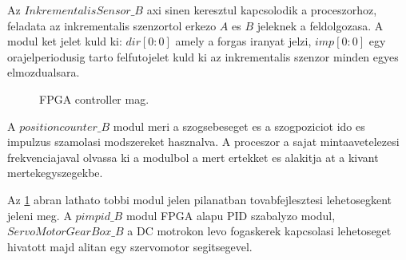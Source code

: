 Az $InkrementalisSensor\_B$ axi sinen keresztul kapcsolodik a proceszorhoz, feladata az inkrementalis szenzortol erkezo $A$ es $B$ jeleknek a feldolgozasa. A modul ket jelet kuld ki: $dir[0:0]$ amely a forgas iranyat jelzi, $imp[0:0]$ egy orajelperiodusig tarto felfutojelet kuld ki az inkrementalis szenzor minden egyes elmozdualsara.
\begin{figure}[H]
  \caption{FPGA controller mag.}
  \label{fig:ControllerMag}
\end{figure}

A $positioncounter\_B$ modul meri a szogsebeseget es a szogpoziciot ido es impulzus szamolasi modszereket hasznalva. A proceszor a sajat mintaavetelezesi frekvenciajaval olvassa ki a modulbol a mert ertekket es alakitja at a kivant mertekegyszegekbe.

Az \ref{fig:ControllerMag} abran lathato tobbi modul jelen pilanatban tovabfejlesztesi lehetosegkent jeleni meg. A $pimpid\_B$ modul FPGA alapu PID szabalyzo modul, $ServoMotorGearBox\_B$ a DC motrokon levo fogaskerek kapcsolasi lehetoseget hivatott majd alitan egy szervomotor segitsegevel.

